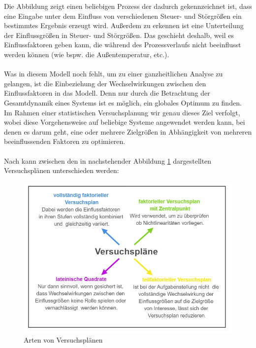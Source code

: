 \documentclass[
fontsize=10pt, 
listof = totoc,
parskip = half	
]{report}
\begin{document}
\noindent Die Abbildung zeigt einen beliebigen Prozess der dadurch gekennzeichnet ist, dass eine Eingabe unter dem Einfluss von verschiedenen Steuer- und Störgrößen ein bestimmtes Ergebnis erzeugt wird. Außerdem zu erkennen ist eine Unterteilung der Einflussgrößen in Steuer- und Störgrößen. Das geschieht deshalb, weil es Einflussfaktoren geben kann, die während des Prozessverlaufs nicht beeinflusst werden können (wie bspw. die Außentemperatur, etc.).
\\\\
\noindent Was in diesem Modell noch fehlt, um zu einer ganzheitlichen Analyse zu gelangen, ist die Einbeziehung der Wechselwirkungen zwischen den Einflussfaktoren in das Modell. Denn nur durch die Betrachtung der Gesamtdynamik eines Systems ist es möglich, ein globales Optimum zu finden. Im Rahmen einer statistischen Versuchsplanung wir genau dieses Ziel verfolgt, wobei diese Vorgehensweise auf beliebige Systeme angewendet werden kann, bei denen es darum geht, eine oder mehrere Zielgrößen in Abhängigkeit von mehreren beeinflussenden Faktoren zu optimieren. 
\\\\
Nach \cite{schiefer_2018} kann zwischen den in nachstehender Abbildung \ref{fig:Versuchsplaene} dargestellten Versuchsplänen unterschieden werden:

\begin{figure}[H]
	\centering
	\includegraphics[scale=0.9]{pics/versuchsplaene}
	\caption{Arten von Versuchsplänen}
	\label{fig:Versuchsplaene}
\end{figure}
\end{document}

